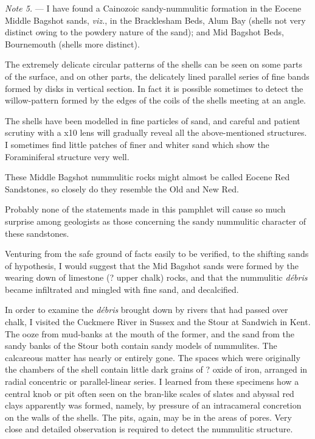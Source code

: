 \documentclass[a4paper, 12pt, oneside]{article}
\begin{document}
\emph{Note 5.} --- I have found a Cainozoic sandy-nummulitic formation in the Eocene Middle Bagshot sands, \emph{viz.}, in the Bracklesham Beds, Alum Bay (shells not very distinct owing to the powdery nature of the sand); and Mid Bagshot Beds, Bournemouth (shells more distinct).

The extremely delicate circular patterns of the shells can be seen on some parts of the surface, and on other parts, the delicately lined parallel series of fine bands formed by disks in vertical section. In fact it is possible sometimes to detect the willow-pattern formed by the edges of the coils of the shells meeting at an angle.

The shells have been modelled in fine particles of sand, and careful and patient scrutiny with a x10 lens will gradually reveal all the above-mentioned structures. I sometimes find little patches of finer and whiter sand which show the Foraminiferal structure very well.

These Middle Bagshot nummulitic rocks might almost be called Eocene Red Sandstones, so closely do they resemble the Old and New Red.

Probably none of the statements made in this pamphlet will cause so much surprise among geologists as those concerning the sandy nummulitic character of these sandstones.

Venturing from the safe ground of facts easily to be verified, to the shifting sands of hypothesis, I would suggest that the Mid Bagshot sands were formed by the wearing down of limestone (? upper chalk) rocks, and that the nummulitic \emph{débris} became infiltrated and mingled with fine sand, and decalcified.

In order to examine the \emph{débris} brought down by rivers that had passed over chalk, I visited the Cuckmere River in Sussex and the Stour at Sandwich in Kent. The ooze from mud-banks at the mouth of the former, and the sand from the sandy banks of the Stour both contain sandy models of nummulites. The calcareous matter has nearly or entirely gone. The spaces which were originally the chambers of the shell contain little dark grains of ? oxide of iron, arranged in radial concentric or parallel-linear series. I learned from these specimens how a central knob or pit often seen on the bran-like scales of slates and abyssal red clays apparently was formed, namely, by pressure of an intracameral concretion on the walls of the shells. The pits, again, may be in the areas of pores. Very close and detailed observation is required to detect the nummulitic structure.
\end{document}
